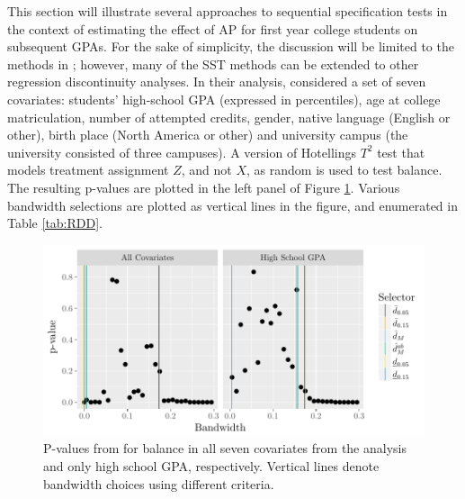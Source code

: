 \documentclass[lineno]{biometrika}\usepackage[]{graphicx}\usepackage[]{color}
\makeatletter
\def\maxwidth{ %
  \ifdim\Gin@nat@width>\linewidth
    \linewidth
  \else
    \Gin@nat@width
  \fi
}
\newenvironment{knitrout}{}{} %
\makeatother
\begin{document}
This section will illustrate several approaches to sequential specification tests in the context
of estimating the effect of AP for first year college students on
subsequent GPAs.
For the sake of simplicity, the discussion will be limited to the methods in \citet{cft}; however, many of
the SST methods can be extended to other regression discontinuity analyses.
In their analysis, \citet{lso}  considered a set of seven covariates:
students' high-school GPA (expressed in percentiles), age at college
matriculation, number of attempted credits, gender, native language
(English or other), birth place (North America or other) and
university campus (the university consisted of three campuses).
A version of Hotellings $T^2$ test that models
treatment assignment $Z$, and not $X$, as random \citep{hansenBowers}
is used to test balance.
The resulting p-values are plotted in the left panel of Figure \ref{fig:rdpvalues1}.
Various bandwidth selections are plotted as vertical lines in the
figure, and enumerated in Table \ref{tab:RDD}.

\begin{figure}
\begin{knitrout}
\color{fgcolor}
\includegraphics[width=\maxwidth]{figure/rdd-1}

\end{knitrout}
\caption{P-values from for balance in all seven covariates
  from the \citet{lso} analysis and only high school GPA, respectively. Vertical lines denote bandwidth choices using
  different criteria.}
\label{fig:rdpvalues1}
\end{figure}
\end{document}
